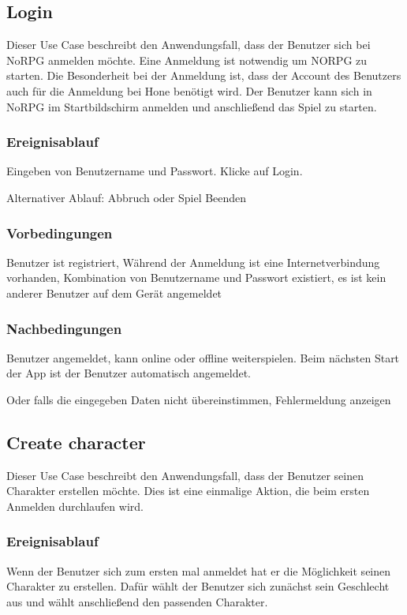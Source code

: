 	\subsection{Login}
		Dieser Use Case beschreibt den Anwendungsfall, dass der Benutzer sich bei NoRPG anmelden möchte. Eine Anmeldung ist notwendig um NORPG zu starten. Die Besonderheit bei der Anmeldung  ist, dass der Account des Benutzers auch für die Anmeldung bei Hone benötigt wird. Der Benutzer kann sich in NoRPG im Startbildschirm anmelden und anschließend das Spiel zu starten.
			
		\subsubsection{Ereignisablauf}
			Eingeben von Benutzername und Passwort.	Klicke auf Login.
			
			Alternativer Ablauf: Abbruch oder Spiel Beenden
			
		\subsubsection{Vorbedingungen}
			Benutzer ist registriert, Während der Anmeldung ist eine Internetverbindung vorhanden, Kombination von Benutzername und Passwort existiert, es ist kein anderer Benutzer auf dem Gerät angemeldet
			
		\subsubsection{Nachbedingungen}
			Benutzer angemeldet, kann online oder offline weiterspielen. Beim nächsten Start der App ist der Benutzer automatisch angemeldet.
			
			Oder falls die eingegeben Daten nicht übereinstimmen, Fehlermeldung anzeigen
	
	\subsection{Create character}
		Dieser Use Case beschreibt den Anwendungsfall, dass der Benutzer seinen Charakter erstellen möchte. Dies ist eine einmalige Aktion, die beim ersten Anmelden durchlaufen wird. 
			
		\subsubsection{Ereignisablauf}
			Wenn der Benutzer sich zum ersten mal anmeldet hat er die Möglichkeit seinen Charakter zu erstellen. Dafür wählt der Benutzer sich zunächst sein Geschlecht aus und wählt anschließend den passenden Charakter.
			
